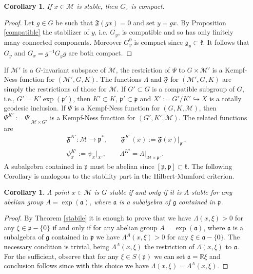 \documentclass[leqno,11pt, a4]{amsart}
\newtheorem{cor}[equation]{Corollary}
\theoremstyle{named}
\begin{document}
\begin{cor}
  \label{stabcomp}
  If $x\in {\mathscr{M}}$ is stable, then $G_x$ is compact.
\end{cor}
\begin{proof}
  Let $g\in G$ be such that ${\mathfrak{F}}(g x)=0$ and set $y=g x$. By
  Proposition \ref{compatible} the stabilizer of $y$, i.e. $G_y$, is compatible and so has only
  finitely many connected components. Moreover $G_y^0$ is compact
  since ${\mathfrak{g}}_y \subset {\mathfrak{k}}$. It follows that $G_y$ and
  $G_x = g{^{-1}} G_y g $ are both compact.
\end{proof}
If ${\mathscr{M}}'$ is a $G$-invariant subspace of $ {\mathscr{M}} $, the
restriction of $\Psi $ to $G\times {\mathscr{M}}'$ is a Kempf-Ness function
for $({\mathscr{M}}', G, K)$. The functions $\Lambda$ and ${\mathfrak{F}}$ for
$({\mathscr{M}}', G, K)$ are simply the restrictions of those for ${\mathscr{M}}$.
If $G'\subset G$ is a compatible subgroup of $G$, i.e., $G'=K'\exp({\mathfrak{p}}')$,
then $K'\subset K$, ${\mathfrak{p}}' \subset {\mathfrak{p}}$ and $X':= G'/K' \hookrightarrow X$ is a totally geodesic inclusion.  If $\Psi$ is a Kempf-Ness
  function for $(G,K, {\mathscr{M}})$, then
  $ \Psi^{K'}:=\Psi{\vert_{{{\mathscr{M}}\times G'}}}$ is a Kempf-Ness function
  for $(G', K', {\mathscr{M}})$.  The related functions are
  \begin{gather}\label{restrizione}
    {\mathfrak{F}}^{K'}: {\mathscr{M}} {\rightarrow} {\mathfrak{p}}^* , \qquad {\mathfrak{F}}^{K'}(x):=
    {\mathfrak{F}}(x){\vert_{{{\mathfrak{p}}'}}},\\
    \psi^{K'}_x := \psi _x {\vert_{{X'}}}, \qquad \Lambda^{K'} = \Lambda
    {\vert_{{{\mathscr{M}}\times {\mathfrak{p}}'}}}.
  \end{gather}
A subalgebra contained in ${\mathfrak{p}}$ must be abelian since $[{\mathfrak{p}},{\mathfrak{p}}]\subset {\mathfrak{k}}$.
The following Corollary is analogous to the stability part in the
Hilbert-Mumford criterion.
\begin{cor}\label{Hilbert-Mumford}
A point $x \in {\mathscr{M}}$ is $G$-stable if and only if it is
$A$-stable for any  abelian group $A=\exp ({\mathfrak{a}})$, where ${\mathfrak{a}}$ is a subalgebra of ${\mathfrak{g}}$ contained in ${\mathfrak{p}}$.
\end{cor}
\begin{proof}
By Theorem \ref{stabile} it is enough to prove that we have $\Lambda(x,\xi) >0$ for any $\xi\in {\mathfrak{p}}{-}\{0\}$ if and only if
for any  abelian group $A=\exp ({\mathfrak{a}})$, where ${\mathfrak{a}}$ is a subalgebra of ${\mathfrak{g}}$ contained in ${\mathfrak{p}}$ we have $\Lambda^A (x,\xi)>0$ for any $\xi\in {\mathfrak{a}}{-}\{0\}$. The necessary condition is trivial, being $\Lambda^A (x,\xi)$ the restriction of $\Lambda (x,\xi)$ to ${\mathfrak{a}}$. For the sufficient, observe that for any $\xi\in S({\mathfrak{p}})$ we can set ${\mathfrak{a}}={\mathbb{R}} \xi$ and conclusion follows since with this choice we have $\Lambda (x, \xi ) = \Lambda^A (x, \xi ) $.
\end{proof}
\end{document}
